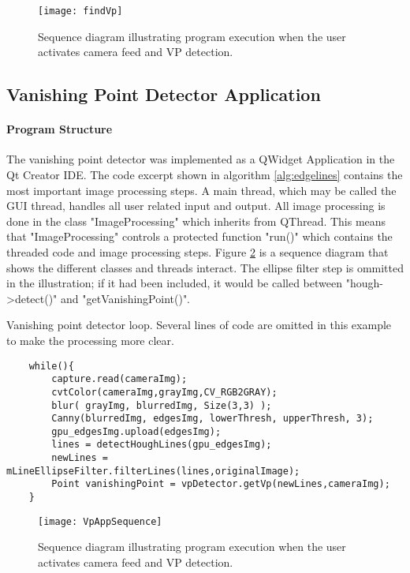 \begin{figure}
	\texttt{[image: findVp]}
	\caption{Sequence diagram illustrating program execution when the user activates camera feed and VP detection.}
	\label{fig:findVp}
\end{figure}

\subsection{Vanishing Point Detector Application}

\paragraph{Program Structure}

The vanishing point detector was implemented as a QWidget Application in the Qt Creator IDE. The code excerpt shown in algorithm \ref{alg:edgelines} contains the most important image processing steps. A main thread, which may be called the GUI thread, handles all user related input and output. All image processing is done in the class "ImageProcessing" which inherits from QThread. This means that "ImageProcessing" controls a protected function "run()" which contains the threaded code and image processing steps. Figure \ref{fig:VpAppSequence} is a sequence diagram that shows the different classes and threads interact. The ellipse filter step is ommitted in the illustration; if it had been included, it would be called between "hough->detect()" and "getVanishingPoint()".

\begin{algorithm}[h]
	\caption{Vanishing point detector loop. Several lines of code are omitted in this example to make the processing more clear.}
	\label{alg:edgelines}
	\begin{verbatim}
	while(){
		capture.read(cameraImg);
		cvtColor(cameraImg,grayImg,CV_RGB2GRAY);
		blur( grayImg, blurredImg, Size(3,3) );
		Canny(blurredImg, edgesImg, lowerThresh, upperThresh, 3);
		gpu_edgesImg.upload(edgesImg);
		lines = detectHoughLines(gpu_edgesImg);   
		newLines = mLineEllipseFilter.filterLines(lines,originalImage);
		Point vanishingPoint = vpDetector.getVp(newLines,cameraImg);     
	}
	\end{verbatim}
\end{algorithm}

\begin{landscape}
	\begin{figure}
		\texttt{[image: VpAppSequence]}
		\caption{Sequence diagram illustrating program execution when the user activates camera feed and VP detection.}
		\label{fig:VpAppSequence}
	\end{figure}
\end{landscape}



